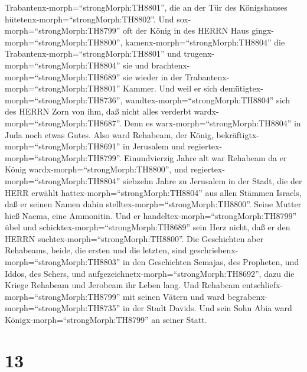 Trabantenx-morph=``strongMorph:TH8801'', die an der Tür des Königshauses
hütetenx-morph=``strongMorph:TH8802''.  Und
sox-morph=``strongMorph:TH8799'' oft der König in des HERRN Haus
gingx-morph=``strongMorph:TH8800'', kamenx-morph=``strongMorph:TH8804''
die Trabantenx-morph=``strongMorph:TH8801'' und
trugenx-morph=``strongMorph:TH8804'' sie und
brachtenx-morph=``strongMorph:TH8689'' sie wieder in der
Trabantenx-morph=``strongMorph:TH8801'' Kammer.  Und weil
er sich demütigtex-morph=``strongMorph:TH8736'',
wandtex-morph=``strongMorph:TH8804'' sich des HERRN Zorn von ihm, daß
nicht alles verderbt wardx-morph=``strongMorph:TH8687''. Denn es
warx-morph=``strongMorph:TH8804'' in Juda noch etwas Gutes.
 Also ward Rehabeam, der König,
bekräftigtx-morph=``strongMorph:TH8691'' in Jerusalem und
regiertex-morph=``strongMorph:TH8799''. Einundvierzig Jahre alt war
Rehabeam da er König wardx-morph=``strongMorph:TH8800'', und
regiertex-morph=``strongMorph:TH8804'' siebzehn Jahre zu Jerusalem in
der Stadt, die der HERR erwählt hattex-morph=``strongMorph:TH8804'' aus
allen Stämmen Israels, daß er seinen Namen dahin
stelltex-morph=``strongMorph:TH8800''. Seine Mutter hieß Naema, eine
Ammonitin.  Und er handeltex-morph=``strongMorph:TH8799''
übel und schicktex-morph=``strongMorph:TH8689'' sein Herz nicht, daß er
den HERRN suchtex-morph=``strongMorph:TH8800''.  Die
Geschichten aber Rehabeams, beide, die ersten und die letzten, sind
geschriebenx-morph=``strongMorph:TH8803'' in den Geschichten Semajas,
des Propheten, und Iddos, des Sehers, und
aufgezeichnetx-morph=``strongMorph:TH8692'', dazu die Kriege Rehabeam
und Jerobeam ihr Leben lang.  Und Rehabeam
entschliefx-morph=``strongMorph:TH8799'' mit seinen Vätern und ward
begrabenx-morph=``strongMorph:TH8735'' in der Stadt Davids. Und sein
Sohn Abia ward Königx-morph=``strongMorph:TH8799'' an seiner Statt.

\hypertarget{section-12}{%
\section{13}\label{section-12}}

